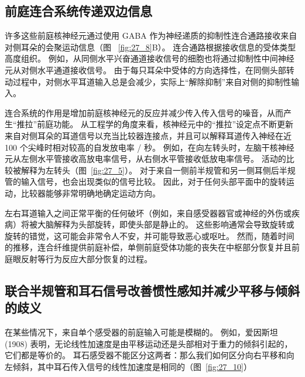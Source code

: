 \subsection{前庭连合系统传递双边信息}

许多这些前庭核神经元通过使用 GABA 作为神经递质的抑制性连合通路接收来自对侧耳朵的会聚运动信息（图 ~\ref{fig:27_8}B）。
连合通路根据接收信息的受体类型高度组织。
例如，从同侧水平兴奋通道接收信号的细胞也将通过抑制性中间神经元从对侧水平通道接收信号。
由于每只耳朵中受体的方向选择性，在同侧头部转动过程中，对侧水平耳道输入总是会减少，实际上“解除抑制”来自对侧的抑制性输入。


连合系统的作用是增加前庭核神经元的反应并减少传入传入信号的噪音，从而产生“推拉”前庭功能。
从工程学的角度来看，核神经元中的“推拉”设定点不断更新来自对侧耳朵的耳道信号以充当比较器连接点，并且可以解释耳道传入神经在近 100 个尖峰时相对较高的自发放电率 / 秒。
例如，在向左转头时，左脑干核神经元从左侧水平管接收高放电率信号，从右侧水平管接收低放电率信号。
活动的比较被解释为左转头（图~\ref{fig:27_5}）。
对于来自一侧前半规管和另一侧耳侧后半规管的输入信号，也会出现类似的信号比较。
因此，对于任何头部平面中的旋转运动，比较器能够非常明确地确定运动方向。


左右耳道输入之间正常平衡的任何破坏（例如，来自感受器器官或神经的外伤或疾病）将被大脑解释为头部旋转，即使头部是静止的。
这些影响通常会导致旋转或旋转的错觉，这可能会非常令人不安，并可能导致恶心或呕吐。
然而，随着时间的推移，连合纤维提供前庭补偿，单侧前庭受体功能的丧失在中枢部分恢复并且前庭眼反射等行为反应大部分恢复的过程。



\subsection{联合半规管和耳石信号改善惯性感知并减少平移与倾斜的歧义}

在某些情况下，来自单个感受器的前庭输入可能是模糊的。
例如，爱因斯坦 (1908) 表明，无论线性加速度是由平移运动还是头部相对于重力的倾斜引起的，它们都是等价的。
耳石感受器不能区分这两者：那么我们如何区分向右平移和向左倾斜，其中耳石传入信号的线性加速度是相同的（图~\ref{fig:27_10}）


